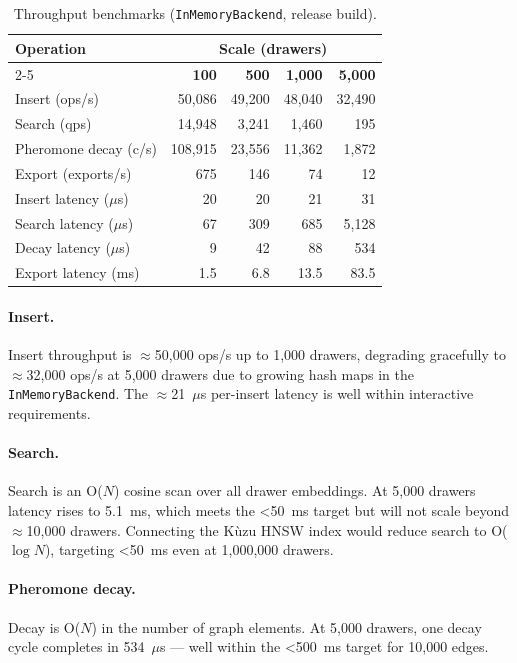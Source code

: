 \documentclass[11pt,a4paper]{article}
\begin{document}
\begin{table}[ht]
\centering
\caption{Throughput benchmarks (\texttt{InMemoryBackend}, release build).}
\label{tab:throughput}
\setlength{\tabcolsep}{5pt}
\begin{tabular}{lrrrr}
\toprule
\multirow{2}{*}{\textbf{Operation}} &
    \multicolumn{4}{c}{\textbf{Scale (drawers)}} \\
\cmidrule(lr){2-5}
 & \textbf{100} & \textbf{500} & \textbf{1,000} & \textbf{5,000} \\
\midrule
Insert (ops/s)         & 50,086 & 49,200 & 48,040 & 32,490 \\
Search (qps)           & 14,948 &  3,241 &  1,460 &    195 \\
Pheromone decay (c/s)  & 108,915 & 23,556 & 11,362 &  1,872 \\
Export (exports/s)     &    675 &    146 &     74 &     12 \\
\midrule
Insert latency ($\mu$s)  &  20 &  20 &  21 &  31 \\
Search latency ($\mu$s)  &  67 & 309 & 685 & 5,128 \\
Decay latency ($\mu$s)   &   9 &  42 &  88 &   534 \\
Export latency (ms)      & 1.5 & 6.8 & 13.5 & 83.5 \\
\bottomrule
\end{tabular}
\end{table}

\paragraph{Insert.}
Insert throughput is $\approx$50,000 ops/s up to 1,000 drawers, degrading
gracefully to $\approx$32,000 ops/s at 5,000 drawers due to growing hash maps
in the \texttt{InMemoryBackend}.  The $\approx$21~$\mu$s per-insert latency is
well within interactive requirements.

\paragraph{Search.}
Search is an O($N$) cosine scan over all drawer embeddings.  At 5,000 drawers
latency rises to 5.1~ms, which meets the \textless50~ms target but will not
scale beyond $\approx$10,000 drawers.  Connecting the Kùzu HNSW index would
reduce search to O($\log N$), targeting \textless50~ms even at 1,000,000
drawers.

\paragraph{Pheromone decay.}
Decay is O($N$) in the number of graph elements.  At 5,000 drawers,
one decay cycle completes in 534~$\mu$s --- well within the \textless500~ms
target for 10,000 edges.
\end{document}
